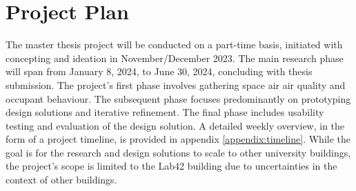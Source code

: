 \section{Project Plan}

The master thesis project will be conducted on a part-time basis, initiated with concepting and ideation in November/December 2023. The main research phase will span from January 8, 2024, to June 30, 2024, concluding with thesis submission. The project's first phase involves gathering space air air quality and occupant behaviour. The subsequent phase focuses predominantly on prototyping design solutions and iterative refinement. The final phase includes usability testing and evaluation of the design solution. A detailed weekly overview, in the form of a project timeline, is provided in appendix \ref{appendix:timeline}. While the goal is for the research and design solutions to scale to other university buildings, the project's scope is limited to the Lab42 building due to uncertainties in the context of other buildings.

